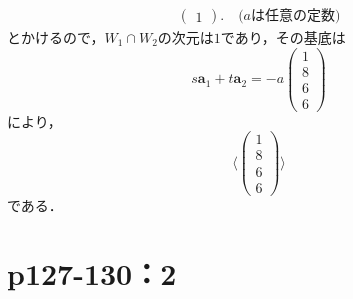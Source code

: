 \documentclass[a4paper,10pt,fleqn]{ltjsarticle}
\begin{document}
\begin{tleftbar}
\begin{align*}
\begin{pmatrix}
            1
        \end{pmatrix}
        . \quad \text{($a$は任意の定数)}
    \end{align*}
    とかけるので，$W_1 \cap W_2$の次元は$1$であり，その基底は
    \[
        s \bm{a}_1+ t \bm{a}_2 =-a \begin{pmatrix} 1 \\ 8 \\ 6 \\ 6 \end{pmatrix}
    \]
    により，
    \[
        \langle
        \begin{pmatrix}
            1 \\
            8 \\
            6 \\
            6
        \end{pmatrix}
        \rangle
    \]
    である．
\end{tleftbar}
\newpage


\section*{p127-130：2}
\end{document}
